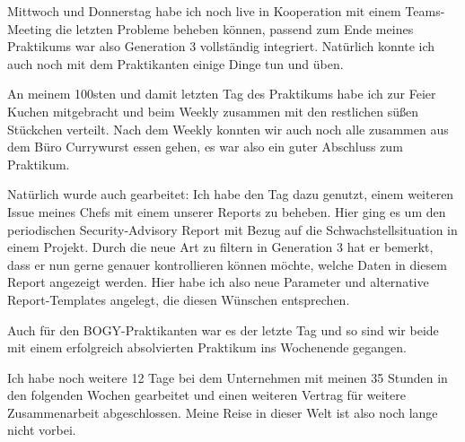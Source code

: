 Mittwoch und Donnerstag habe ich noch live in Kooperation mit einem Teams-Meeting die letzten Probleme beheben können, passend zum Ende meines Praktikums war also Generation 3 vollständig integriert.
Natürlich konnte ich auch noch mit dem Praktikanten einige Dinge tun und üben.


An meinem 100sten und damit letzten Tag des Praktikums habe ich zur Feier Kuchen mitgebracht und beim Weekly zusammen mit den restlichen süßen Stückchen verteilt.
Nach dem Weekly konnten wir auch noch alle zusammen aus dem Büro Currywurst essen gehen, es war also ein guter Abschluss zum Praktikum.

Natürlich wurde auch gearbeitet:
Ich habe den Tag dazu genutzt, einem weiteren Issue meines Chefs mit einem unserer Reports zu beheben.
Hier ging es um den periodischen Security-Advisory Report mit Bezug auf die Schwachstellsituation in einem Projekt.
Durch die neue Art zu filtern in Generation 3 hat er bemerkt, dass er nun gerne genauer kontrollieren können möchte, welche Daten in diesem Report angezeigt werden.
Hier habe ich also neue Parameter und alternative Report-Templates angelegt, die diesen Wünschen entsprechen.

Auch für den BOGY-Praktikanten war es der letzte Tag und so sind wir beide mit einem erfolgreich absolvierten Praktikum ins Wochenende gegangen.

Ich habe noch weitere 12 Tage bei dem Unternehmen mit meinen 35 Stunden in den folgenden Wochen gearbeitet und einen weiteren Vertrag für weitere Zusammenarbeit abgeschlossen.
Meine Reise in dieser Welt ist also noch lange nicht vorbei.
